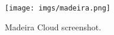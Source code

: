 \begin{figure}[tb]
  \texttt{[image: imgs/madeira.png]}
  \caption{Madeira Cloud screenshot.}
  \label{fig:madiera}
\end{figure}
